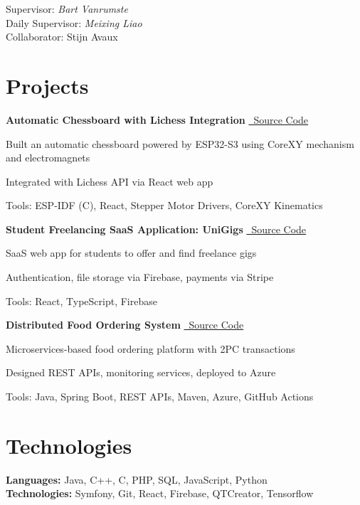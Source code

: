 \documentclass[10pt,a4paper]{article}
\begin{document}
Supervisor: \textit{Bart Vanrumste} \\
Daily Supervisor: \textit{Meixing Liao} \\
Collaborator: Stijn Avaux

\section{Projects}
\textbf{Automatic Chessboard with Lichess Integration} \hfill \href{https://github.com/nicogutz/ESP32_BoardCode/tree/master}{\faGithub\ Source Code}  
\begin{highlights}
    \item Built an automatic chessboard powered by ESP32-S3 using CoreXY mechanism and electromagnets
    \item Integrated with Lichess API via React web app
    \item Tools: ESP-IDF (C), React, Stepper Motor Drivers, CoreXY Kinematics
\end{highlights}

\textbf{Student Freelancing SaaS Application: UniGigs} \hfill \href{https://github.com/SaaS-Team-1/FreelanceApp}{\faGithub\ Source Code}  
\begin{highlights}
    \item SaaS web app for students to offer and find freelance gigs
    \item Authentication, file storage via Firebase, payments via Stripe
    \item Tools: React, TypeScript, Firebase
\end{highlights}

\textbf{Distributed Food Ordering System} \hfill \href{https://github.com/Yornared/Food-ordering-webshop}{\faGithub\ Source Code}  
\begin{highlights}
    \item Microservices-based food ordering platform with 2PC transactions
    \item Designed REST APIs, monitoring services, deployed to Azure
    \item Tools: Java, Spring Boot, REST APIs, Maven, Azure, GitHub Actions
\end{highlights}

\section{Technologies}
\textbf{Languages:} Java, C++, C, PHP, SQL, JavaScript, Python\\
\textbf{Technologies:} Symfony, Git, React, Firebase, QTCreator, Tensorflow
\end{document}
